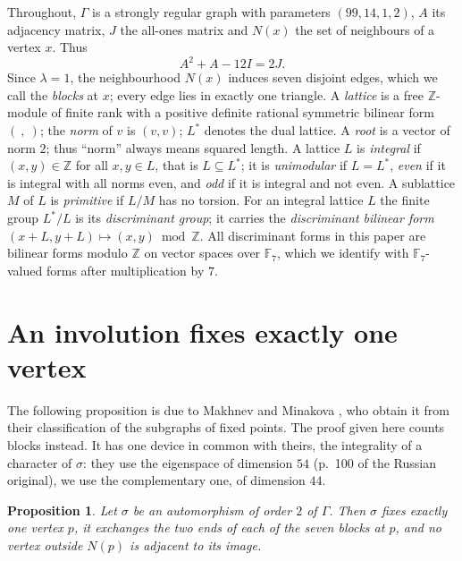 \documentclass[11pt]{amsart}
\newtheorem{proposition}[theorem]{Proposition}
\theoremstyle{definition}
\theoremstyle{remark}
\newcommand{\Z}{\mathbb{Z}}
\newcommand{\F}{\mathbb{F}}
\newcommand{\G}{\Gamma}
\newcommand{\s}{\sigma}
\begin{document}
Throughout, $\G$ is a strongly regular graph with parameters $(99,14,1,2)$, $A$ its adjacency matrix, $J$ the all-ones matrix
and $N(x)$ the set of neighbours of a vertex $x$. Thus
\begin{equation}\label{eq:srg}
A^2+A-12I=2J .
\end{equation}
Since $\lambda=1$, the neighbourhood $N(x)$ induces seven disjoint edges, which we call the \emph{blocks} at $x$; every edge
lies in exactly one triangle. A \emph{lattice} is a free $\Z$-module of finite rank with a positive definite rational
symmetric bilinear form $(\ ,\ )$; the \emph{norm} of $v$ is $(v,v)$; $L^*$ denotes the dual lattice. A \emph{root} is a vector of norm $2$; thus ``norm'' always means squared length. A lattice $L$ is \emph{integral} if
$(x,y)\in\Z$ for all $x,y\in L$, that is $L\subseteq L^*$; it is \emph{unimodular} if $L=L^*$, \emph{even} if it is integral
with all norms even, and \emph{odd} if it is integral and not even. A sublattice $M$ of $L$ is \emph{primitive} if $L/M$ has
no torsion. For an integral lattice $L$ the finite group $L^*/L$ is its \emph{discriminant group}; it carries the
\emph{discriminant bilinear form} $(x+L,y+L)\mapsto(x,y)\bmod\Z$. All discriminant forms in this paper are bilinear forms
modulo $\Z$ on vector spaces over $\F_7$, which we identify with $\F_7$-valued forms after multiplication by $7$.

\section{An involution fixes exactly one vertex}\label{sec:fix}

The following proposition is due to Makhnev and Minakova \cite[Theorem~1]{MM}, who obtain it from their classification of
the subgraphs of fixed points. The proof given here counts blocks instead. It has one device in common with theirs, the
integrality of a character of $\s$: they use the eigenspace of dimension $54$ (p.~100 of the Russian original), we use the
complementary one, of dimension $44$.

\begin{proposition}\label{prop:fix}
Let $\s$ be an automorphism of order $2$ of $\G$. Then $\s$ fixes exactly one vertex $p$, it exchanges the two ends of each of
the seven blocks at $p$, and no vertex outside $N(p)$ is adjacent to its image.
\end{proposition}
\end{document}
